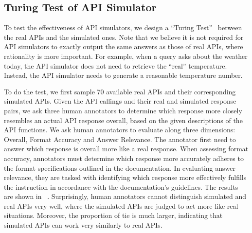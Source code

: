 



\subsection{Turing Test of API Simulator}
To test the effectiveness of API simulators, we design a ``Turing Test''~\cite{Turing2009} between the real APIs and the simulated ones.
Note that we believe it is not required for API simulators to exactly output the same answers as those of real APIs, where rationality is more important.
For example, when a query asks about the weather today, the API simulator does not need to retrieve the ``real'' temperature. Instead, the API simulator needs to generate a reasonable temperature number.

To do the test, we first sample 70 available real APIs and their corresponding simulated APIs. 
Given the API callings and their real and simulated response pairs, we ask three human annotators to determine which response more closely resembles an actual API response overall, based on the given descriptions of the API functions.
We ask human annotators to evaluate along three dimensions: Overall, Format Accuracy and Answer Relevance.
The annotator first need to answer which response is overall more like a real response.
When assessing format accuracy, annotators must determine which response more accurately adheres to the format specifications outlined in the documentation. In evaluating answer relevance, they are tasked with identifying which response more effectively fulfills the instruction in accordance with the documentation's guidelines.
The results are shown in ~.
Surprisingly, human annotators cannot distinguish simulated and real APIs very well, where the simulated APIs are judged to act more like real situations.
Moreover, the proportion of tie is much larger, indicating that simulated APIs can work very similarly to real APIs.


